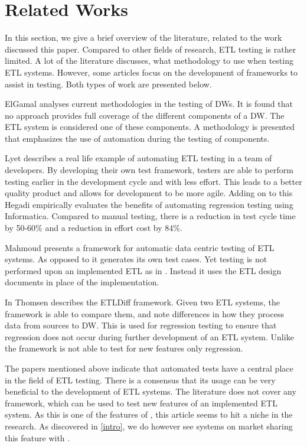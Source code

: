 \section{Related Works}\label{sect:RelatedWorks}
In this section, we give a brief overview of the literature, related to the work discussed this paper. Compared to other fields of research, ETL testing is rather limited. A lot of the literature discusses, what methodology to use when testing ETL systems. However, some articles focus on the development of frameworks to assist in testing. Both types of work are presented below.

ElGamal \cite{elgamal2012towards} analyses current methodologies in the testing of DWs. It is found that no approach provides full coverage of the different components of a DW. The ETL system is considered one of these components. A methodology is presented that emphasizes the use of automation during the testing of components.

Lyet \cite{subuiyer2014} describes a real life example of automating ETL testing in a team of developers. By developing their own test framework, testers are able to perform testing earlier in the development cycle and with less effort. This leads to a better quality product and allows for development to be more agile. Adding on to this Hegadi \cite{manjunath2012case} empirically evaluates the benefits of automating regression testing using Informatica. Compared to manual testing, there is a reduction in test cycle time by 50-60\% and a reduction in effort cost by 84\%.

Mahmoud \cite{dakroryautomated} presents a framework for automatic data centric testing of ETL systems. As opposed to \FW{} it generates its own test cases. Yet testing is not performed upon an implemented ETL as in \FW{}. Instead it uses the ETL design documents in place of the implementation.

In \cite{thomsen2006etldiff} Thomsen describes the ETLDiff framework. Given two ETL systems, the framework is able to compare them, and note differences in how they process data from sources to DW. This is used for regression testing to ensure that regression does not occur during further development of an ETL system. Unlike \FW the framework is not able to test for new features only regression.

The papers mentioned above indicate that automated tests have a central place in the field of ETL testing. There is a consensus that its usage can be very beneficial to the development of ETL systems. The literature does not cover any framework, which can be used to test new features of an implemented ETL system. As this is one of the features of \FW{}, this article seems to hit a niche in the research. As discovered in \cref{intro}, we do however see systems on market sharing this feature with \FW{}.
